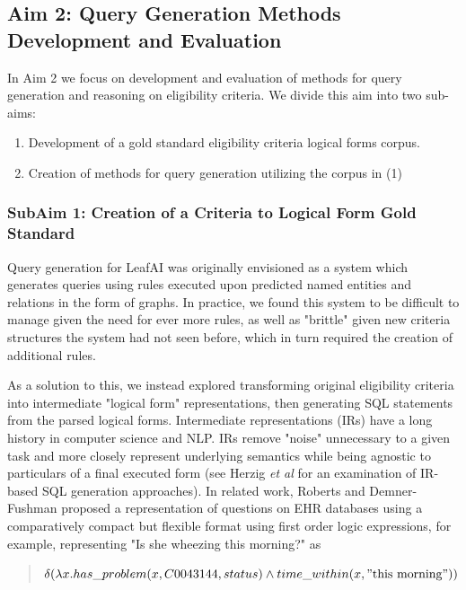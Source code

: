\documentclass[../main.tex]{subfiles}
\begin{document}
\subsection{Aim 2: Query Generation Methods Development and Evaluation}

In Aim 2 we focus on development and evaluation of methods for query generation and reasoning on eligibility criteria. We divide this aim into two sub-aims:

\begin{enumerate}
    \item Development of a gold standard eligibility criteria logical forms corpus.
    \item Creation of methods for query generation utilizing the corpus in (1)
\end{enumerate}

\subsubsection{SubAim 1: Creation of a Criteria to Logical Form Gold Standard}

Query generation for LeafAI was originally envisioned as a system which generates queries using rules executed upon predicted named entities and relations in the form of graphs. In practice, we found this system to be difficult to manage given the need for ever more rules, as well as "brittle" given new criteria structures the system had not seen before, which in turn required the creation of additional rules.

As a solution to this, we instead explored transforming original eligibility criteria into intermediate "logical form" representations, then generating SQL statements from the parsed logical forms. Intermediate representations (IRs) have a long history in computer science and NLP. IRs remove "noise" unnecessary to a given task and more closely represent underlying semantics while being agnostic to particulars of a final executed form (see Herzig \textit{et al} \cite{herzig2021unlocking} for an examination of IR-based SQL generation approaches). In related work, Roberts and Demner-Fushman \cite{roberts2016annotating} proposed a representation of questions on EHR databases using a comparatively compact but flexible format using first order logic expressions, for example, representing "Is she wheezing this morning?" as

\begin{quote}
    \centering
    $\delta( \lambda x.has\_problem(x, C0043144, status) \wedge time\_within(x, \mathrm{"this\ morning"}))$
\end{quote}
\end{document}

